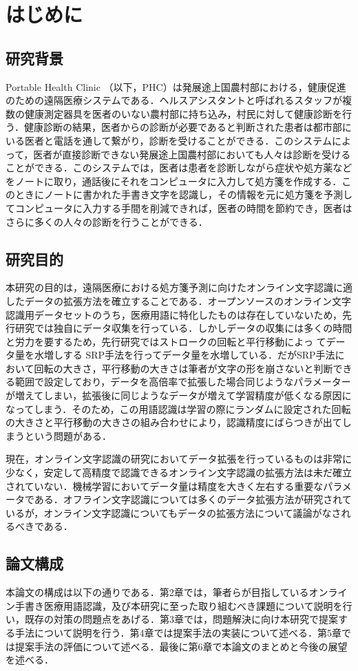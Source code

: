 
\chapter{はじめに}
\label{cha:intro}
\section{研究背景}
\label{sec:background}
Portable Health Clinic （以下，PHC）は発展途上国農村部における，健康促進のための遠隔医療システムである\cite{ahmed15:portable}．ヘルスアシスタントと呼ばれるスタッフが複数の健康測定器具を医者のいない農村部に持ち込み，村民に対して健康診断を行う．健康診断の結果，医者からの診断が必要であると判断された患者は都市部にいる医者と電話を通して繋がり，診断を受けることができる．このシステムによって，医者が直接診断できない発展途上国農村部においても人々は診断を受けることができる．このシステムでは，医者は患者を診断しながら症状や処方薬などをノートに取り，通話後にそれをコンピュータに入力して処方箋を作成する．このときにノートに書かれた手書き文字を認識し，その情報を元に処方箋を予測してコンピュータに入力する手間を削減できれば，医者の時間を節約でき，医者はさらに多くの人々の診断を行うことができる．

\section{研究目的}
本研究の目的は，遠隔医療における処方箋予測に向けたオンライン文字認識に適したデータの拡張方法を確立することである．オープンソースのオンライン文字認識用データセットのうち，医療用語に特化したものは存在していないため，先行研究\cite{takahashi}では独自にデータ収集を行っている．しかしデータの収集には多くの時間と労力を要するため，先行研究ではストロークの回転と平行移動によっ てデータ量を水増しする SRP手法を行ってデータ量を水増している．だがSRP手法において回転の大きさ，平行移動の大きさは筆者が文字の形を崩さないと判断できる範囲で設定しており，データを高倍率で拡張した場合同じようなパラメーターが増えてしまい，拡張後に同じようなデータが増えて学習精度が低くなる原因になってしまう．そのため，この用語認識は学習の際にランダムに設定された回転の大きさと平行移動の大きさの組み合わせにより，認識精度にばらつきが出てしまうという問題がある．

現在，オンライン文字認識の研究においてデータ拡張を行っているものは非常に少なく，安定して高精度で認識できるオンライン文字認識の拡張方法は未だ確立されていない．機械学習においてデータ量は精度を大きく左右する重要なパラメータである．オフライン文字認識については多くのデータ拡張方法が研究されているが，オンライン文字認識についてもデータの拡張方法について議論がなされるべきである．


\section{論文構成}
本論文の構成は以下の通りである．第2章では，筆者らが目指しているオンライン手書き医療用語認識，及び本研究に至った取り組むべき課題について説明を行い，既存の対策の問題点をあげる．第3章では，問題解決に向け本研究で提案する手法について説明を行う．第4章では提案手法の実装について述べる．第5章では提案手法の評価について述べる．最後に第6章で本論文のまとめと今後の展望を述べる．
